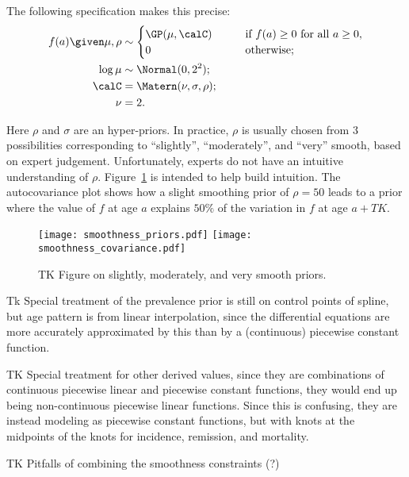 The following specification makes this precise:
\begin{align*}
f(a) \given \mu,\rho &\sim
\begin{cases} \GP(\mu, \calC) &\qquad\text{if } f(a) \geq 0 \text{ for all } a \geq 0,\\
0 &\qquad\text{otherwise;}\\
\end{cases}\\
\log \mu &\sim \Normal(0, 2^2);\\
\calC &= \Matern(\nu, \sigma, \rho);\\
\nu &= 2.
\end{align*}

Here $\rho$ and $\sigma$ are an hyper-priors.  In practice, $\rho$ is
usually chosen from $3$ possibilities corresponding to ``slightly'',
``moderately'', and ``very'' smooth, based on expert judgement.
Unfortunately, experts do not have an intuitive understanding of
$\rho$. Figure~\ref{theory-age_pattern_model-smoothness_priors} is
intended to help build intuition. The autocovariance plot shows how a
slight smoothing prior of $\rho=50$ leads to a prior where the value
of $f$ at age $a$ explains $50\%$ of the variation in $f$ at age
$a+TK$.  

\begin{figure}[h]
\begin{center}
\texttt{[image: smoothness\_priors.pdf]}
\texttt{[image: smoothness\_covariance.pdf]}
\end{center}
\caption{TK Figure on slightly, moderately, and very smooth priors.}
\label{theory-age_pattern_model-smoothness_priors}
\end{figure}

Tk Special treatment of the prevalence prior is still on control
points of spline, but age pattern is from linear interpolation, since
the differential equations are more accurately approximated by this
than by a (continuous) piecewise constant function.

TK Special treatment for other derived values, since they are
combinations of continuous piecewise linear and piecewise constant
functions, they would end up being non-continuous piecewise linear
functions.  Since this is confusing, they are instead modeling as
piecewise constant functions, but with knots at the midpoints of the
knots for incidence, remission, and mortality.

TK Pitfalls of combining the smoothness constraints (?)

